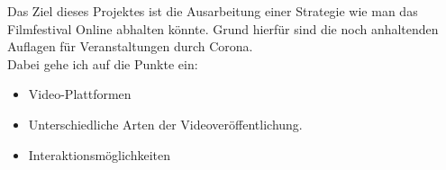 
Das Ziel dieses Projektes ist die Ausarbeitung einer Strategie wie man das Filmfestival Online abhalten könnte.
Grund hierfür sind die noch anhaltenden Auflagen für Veranstaltungen durch Corona.\\

Dabei gehe ich auf die Punkte ein: \\

\begin{itemize}
  \item Video-Plattformen
  \item Unterschiedliche Arten der Videoveröffentlichung.
  \item Interaktionsmöglichkeiten
\end{itemize}

